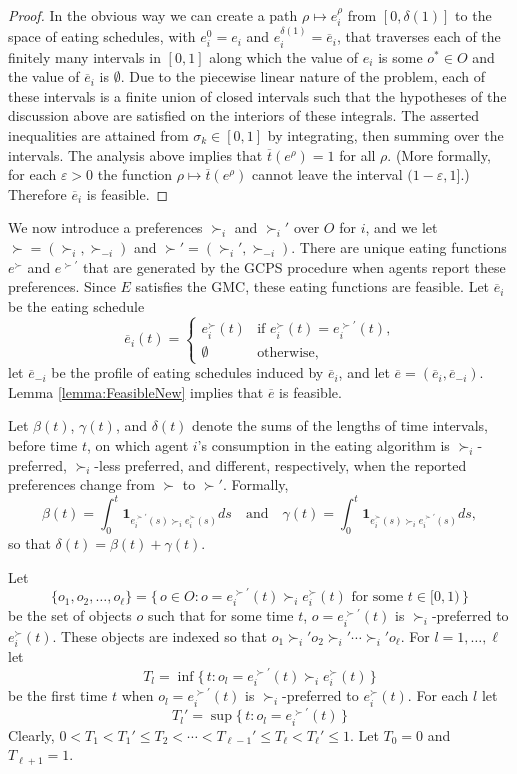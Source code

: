 \documentclass[12pt]{article}
\theoremstyle{definition}
\newcommand{\bare}{\overline{e}}
\newcommand{\bart}{{\overline t}}
\newcommand{\varep}{\varepsilon}
\newcommand{\bone}{\mathbf{1}}
\begin{document}
\begin{appendix}
\begin{proof}
  In the obvious way we can create a path $\rho \mapsto e_i^\rho$ from $[0,\delta(1)]$ to the space of eating schedules, with $e_i^0 = e_i$ and $e_i^{\delta(1)} = \bare_i$, that traverses each of the finitely many intervals in $[0,1]$ along which the value of $e_i$ is some $o^* \in O$ and the value of $\bare_i$ is $\emptyset$. Due to the piecewise linear nature of the problem, each of these intervals is a finite union of closed intervals such that the hypotheses of the discussion above are satisfied on the interiors of these integrals.  
  The asserted inequalities are attained from $\sigma_k \in [0,1]$ by integrating, then summing over the intervals. The 
  analysis above implies that $\bart(e^\rho) = 1$ for all $\rho$.  
  (More formally, for each $\varep > 0$ the function 
  $\rho \mapsto \bart(e^\rho)$ cannot leave the interval $(1 - \varep,1]$.)  Therefore $\bare_i$ is feasible.
\end{proof}

We now introduce a preferences $\succ_i$ and  $\succ_i'$ over $O$ for $i$, and we let $\succ = (\succ_i,\succ_{-i})$ and $\succ' = (\succ_i',\succ_{-i})$.  There are unique eating functions $e^\succ$ and  $e^{\succ'}$ that are  generated by the GCPS procedure when agents report these preferences.  Since $E$ satisfies the GMC, these eating functions are feasible.
Let $\bare_i$ be the eating schedule
$$\bare_i(t) = 
\begin{cases}
  e_i^\succ(t) & \text{if $e_i^\succ(t) = e_i^{\succ'}(t)$,} \\
  \emptyset & \text{otherwise},
\end{cases}$$
let $\bare_{-i}$ be the profile of eating schedules induced by $\bare_i$, and let $\bare = (\bare_i,\bare_{-i})$.  Lemma \ref{lemma:FeasibleNew} implies that $\bare$ is feasible.

Let $\beta(t)$, $\gamma(t)$, and $\delta(t)$ denote the sums of the lengths of time intervals, before time $t$, on which agent $i$'s consumption in the eating algorithm is $\succ_i$-preferred, $\succ_i$-less preferred, and different, respectively, when the reported preferences change from $\succ$ to $\succ'$.  Formally,
$$\beta(t) = \int_0^t \bone_{e_i^{\succ'}(s) \succ_i e_i^\succ(s)} ds \quad \text{and} \quad \gamma(t) = \int_0^t \bone_{e_i^{\succ}(s) \succ_i e_i^{\succ'}(s)} ds,$$ so that $\delta(t) = \beta(t) + \gamma(t)$.

Let
$$\{o_1, o_2, \ldots, o_{\ell}\} = \{\, o \in O : \text{$o = e_i^{\succ'}(t) \succ_i e_i^\succ(t)$ for some $t \in [0,1)$} \,\}$$
be the set of objects $o$ such that for some time $t$, $o = e_i^{\succ'}(t)$ is $\succ_i$-preferred to $e_i^\succ(t)$.  
These objects are indexed so that 
$o_1 \succ_i' o_2 \succ_i' \cdots \succ_i' o_{\ell}$.  For $l = 1, \ldots, \ell$ let
$$T_l = \inf \{\, t : o_l = e_i^{\succ'}(t) \succ_i e_i^\succ(t) \,\}$$ 
be the first time $t$ when $o_l = e_i^{\succ'}(t)$ is $\succ_i$-preferred to $e_i^\succ(t)$.  For each $l$ let 
$$T_l' = \sup \{\, t : o_l = e_i^{\succ'}(t) \,\}$$ 
Clearly, $0 < T_1 < T_1' \le T_2 < \cdots < T_{\ell - 1}' \le T_{\ell} < T_{\ell}' \le1$.  Let $T_0= 0$ and $T_{\ell + 1} = 1$.




\end{appendix}
\end{document}

